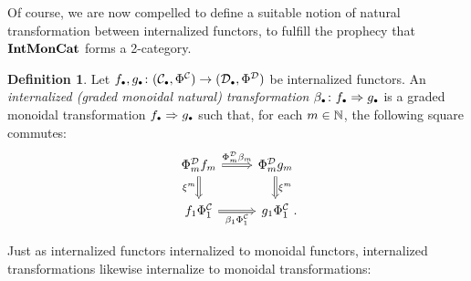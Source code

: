 \documentclass[openany, amssymb, psamsfonts]{amsart}
\theoremstyle{definition}
\newtheorem{defn}{Definition}[section]
\numberwithin{equation}{section}
\begin{document}
Of course, we are now compelled to define a suitable notion of natural transformation between internalized functors, to fulfill the prophecy that $\textbf{\textup{IntMonCat}}$ forms a 2-category.

\begin{defn} \label{def:int_trans}
Let $f_\sbull, g_\sbull \colon (\C_\sbull, \Phi^\C) \to (\D_\sbull, \Phi^\D)$ be internalized functors. An \emph{internalized (graded monoidal natural) transformation $\beta_\sbull \colon f_\sbull \Rightarrow g_\sbull$} is a graded monoidal transformation $f_\sbull \Rightarrow g_\sbull$ such that, for each $m \in \mathbb{N}$, the following square commutes:
\begin{equation*}
\begin{tikzcd}
    \Phi^\D_mf_m \ar[r, Rightarrow, "\Phi_m^\D\beta_m"] \ar[d, Rightarrow, "\xi^m"'] & \Phi_m^\D g_m \ar[d, Rightarrow, "\xi^m"]\\
    f_1\Phi^\C_1 \ar[r, Rightarrow, "\beta_1\Phi^\C_1"'] & g_1\Phi_1^\C \period
\end{tikzcd}
\end{equation*}
\end{defn}

Just as internalized functors internalized to monoidal functors, internalized transformations likewise internalize to monoidal transformations:
\end{document}
